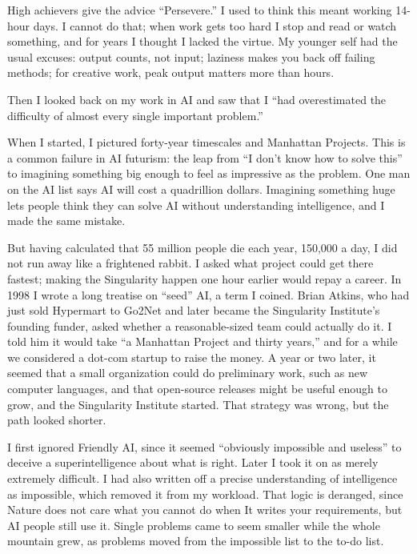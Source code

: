 
High achievers give the advice ``Persevere.'' I used to think this meant working 14-hour days. I cannot do that; when work gets too hard I stop and read or watch something, and for years I thought I lacked the virtue. My younger self had the usual excuses: output counts, not input; laziness makes you back off failing methods; for creative work, peak output matters more than hours.

Then I looked back on my work in AI and saw that I ``had overestimated the difficulty of almost every single important problem.'' 

When I started, I pictured forty-year timescales and Manhattan Projects.  This is a common failure in AI futurism: the leap from ``I don't know how to solve this'' to imagining something big enough to feel as impressive as the problem. One man on the AI list says AI will cost a quadrillion dollars. Imagining something huge lets people think they can solve AI without understanding intelligence, and I made the same mistake.

But having calculated that 55 million people die each year, 150,000 a day, I did not run away like a frightened rabbit. I asked what project could get there fastest; making the Singularity happen one hour earlier would repay a career. In 1998 I wrote a long treatise on ``seed'' AI, a term I coined. Brian Atkins, who had just sold Hypermart to Go2Net and later became the Singularity Institute's founding funder, asked whether a reasonable-sized team could actually do it. I told him it would take ``a Manhattan Project and thirty years,'' and for a while we considered a dot-com startup to raise the money. A year or two later, it seemed that a small organization could do preliminary work, such as new computer languages, and that open-source releases might be useful enough to grow, and the Singularity Institute started. That strategy was wrong, but the path looked shorter. 

I first ignored Friendly AI, since it seemed ``obviously impossible and useless'' to deceive a superintelligence about what is right. Later I took it on as merely extremely difficult. I had also written off a precise understanding of intelligence as impossible, which removed it from my workload. That logic is deranged, since Nature does not care what you cannot do when It writes your requirements, but AI people still use it. Single problems came to seem smaller while the whole mountain grew, as problems moved from the impossible list to the to-do list.

